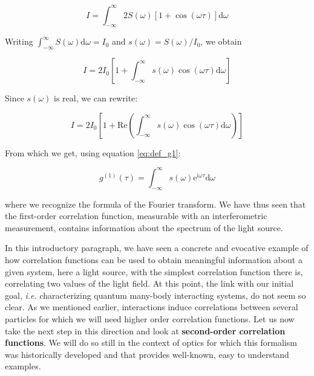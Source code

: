 \begin{equation}
    I=\int_{-\infty}^{\infty} 2 S(\omega)[1+\cos (\omega \tau)] \mathrm{d} \omega
\end{equation}

Writing $\int_{-\infty}^{\infty} S(\omega) \mathrm{d} \omega=I_{0}$ and $s(\omega)=S(\omega) / I_{0}$, we obtain

\begin{equation}
    I=2 I_{0}\left[1+\int_{-\infty}^{\infty} s(\omega) \cos (\omega \tau) \mathrm{d} \omega\right]
\end{equation}

Since $s(\omega)$ is real, we can rewrite:

\begin{equation}
    I=2 I_{0}\left[1+\mathrm{Re} \left(\int_{-\infty}^{\infty} s(\omega) \cos (\omega \tau) \mathrm{d} \omega\right)\right]
\end{equation}

From which we get, using equation \ref{eq:def_g1}:

\begin{equation}
    g^{(1)}(\tau)=\int_{-\infty}^{\infty} s(\omega) \mathrm{e}^{\mathrm{i} \omega \tau} \mathrm{d} \omega
\end{equation}

where we recognize the formula of the Fourier transform. We have thus seen that the first-order correlation function, measurable with an interferometric measurement, contains information about the spectrum of the light source. 




In this introductory paragraph, we have seen a concrete and evocative example of how correlation functions can be used to obtain meaningful information about a given system, here a light source, with the simplest correlation function there is, correlating two values of the light field. At this point, the link with our initial goal, {\it i.e.} characterizing quantum many-body interacting systems, do not seem so clear. As we mentioned earlier, interactions induce correlations between several particles for which we will need higher order correlation functions. Let us now take the next step in this direction and look at \textbf{second-order correlation functions}. We will do so still in the context of optics for which this formalism was historically developed and that provides well-known, easy to understand examples.

